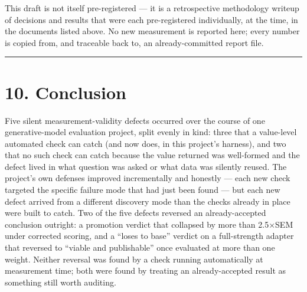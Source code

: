 This draft is not itself pre-registered --- it is a retrospective
methodology writeup of decisions and results that were each
pre-registered individually, at the time, in the documents listed above.
No new measurement is reported here; every number is copied from, and
traceable back to, an already-committed report file.

\begin{center}\rule{0.5\linewidth}{0.5pt}\end{center}

\hypertarget{conclusion}{%
\section{10. Conclusion}\label{conclusion}}

Five silent measurement-validity defects occurred over the course of one
generative-model evaluation project, split evenly in kind: three that a
value-level automated check can catch (and now does, in this project's
harness), and two that no such check can catch because the value
returned was well-formed and the defect lived in what question was asked
or what data was silently reused. The project's own defenses improved
incrementally and honestly --- each new check targeted the specific
failure mode that had just been found --- but each new defect arrived
from a different discovery mode than the checks already in place were
built to catch. Two of the five defects reversed an already-accepted
conclusion outright: a promotion verdict that collapsed by more than
2.5×SEM under corrected scoring, and a ``loses to base'' verdict on a
full-strength adapter that reversed to ``viable and publishable'' once
evaluated at more than one weight. Neither reversal was found by a check
running automatically at measurement time; both were found by treating
an already-accepted result as something still worth auditing.

